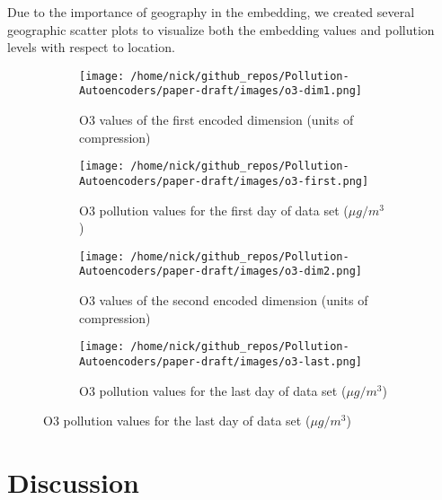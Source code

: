 \documentclass{article}
\begin{document}
\par Due to the importance of geography in the embedding, we created several geographic scatter plots to visualize both the embedding values and pollution levels with respect to location.

\begin{figure}[h!]
    \caption{Geographic comparison of model embedding values versus daily pollution levels}
    \label{fig:outliers_vs_dense_cities}
\begin{subfigure}{0.5\textwidth}
    \centering
    \texttt{[image: /home/nick/github\_repos/Pollution-Autoencoders/paper-draft/images/o3-dim1.png]} 
    \caption{O3 values of the first encoded dimension (units of compression)}
    \label{fig:outliers}
\end{subfigure}
\begin{subfigure}{0.5\textwidth}
    \centering
    \texttt{[image: /home/nick/github\_repos/Pollution-Autoencoders/paper-draft/images/o3-first.png]}
    \caption{O3 pollution values for the first day of data set ($\mu g/m^3$)}
    \label{fig:dense_cities}
\end{subfigure}
\begin{subfigure}{0.5\textwidth}
    \centering
    \texttt{[image: /home/nick/github\_repos/Pollution-Autoencoders/paper-draft/images/o3-dim2.png]} 
    \caption{O3 values of the second encoded dimension (units of compression)}
    \label{fig:outliers}
\end{subfigure}
\begin{subfigure}{0.5\textwidth}
    \centering
    \texttt{[image: /home/nick/github\_repos/Pollution-Autoencoders/paper-draft/images/o3-last.png]}
    \caption{O3 pollution values for the last day of data set ($\mu g/m^3$)}
    \label{fig:dense_cities}
\end{subfigure}
\end{figure}

\newpage

\section{Discussion}
\end{document}
